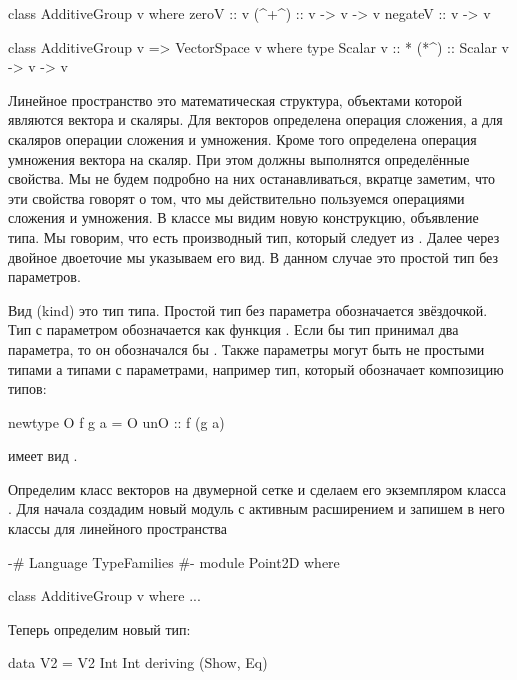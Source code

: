\begin{code}
class AdditiveGroup v where
    zeroV   :: v
    (^+^)   :: v -> v -> v
    negateV :: v -> v

class AdditiveGroup v => VectorSpace v where
    type Scalar v   :: *
    (*^)            :: Scalar v -> v -> v
\end{code}

Линейное пространство это математическая структура, объектами которой
являются вектора и скаляры. Для векторов определена операция сложения, а
для скаляров операции сложения и умножения. Кроме того определена
операция умножения вектора на скаляр. При этом должны выполнятся
определённые свойства. Мы не будем подробно на них останавливаться,
вкратце заметим, что эти свойства говорят о том, что мы действительно
пользуемся операциями сложения и умножения. В классе  мы
видим новую конструкцию, объявление типа. Мы говорим, что есть
производный тип, который следует из . Далее через двойное
двоеточие мы указываем его вид. В данном случае это простой тип без
параметров.

Вид  (kind) это тип типа. Простой тип без параметра
обозначается звёздочкой. Тип с параметром обозначается как функция
\In{* -> *}. Если бы тип принимал два параметра, то он обозначался бы
\In{* -> * -> *}. Также параметры могут быть не простыми типами а типами
с параметрами, например тип, который обозначает композицию типов:


\begin{code}
newtype O f g a = O { unO :: f (g a) }
\end{code}

\noindent 

имеет вид \In{(* -> *) -> (* -> *) -> * -> *}.

Определим класс векторов на двумерной сетке и сделаем его экземпляром
класса . Для начала создадим новый модуль с активным
расширением  и запишем в него классы для линейного
пространства


\begin{code}
{-# Language TypeFamilies #-}
module Point2D where

class AdditiveGroup v where
...
\end{code}

Теперь определим новый тип:


\begin{code}
data V2 = V2 Int Int
    deriving (Show, Eq)
\end{code}

